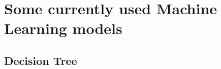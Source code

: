 \section{Some currently used Machine Learning models}


  \subsection{Decision Tree}
  \label{sec:dec-tree}
